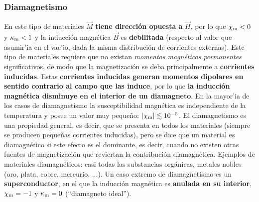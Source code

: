\subsubsection{Diamagnetismo}
En este tipo de materiales $\vec{M}$ \textbf{tiene dirección opuesta a}  $\vec{H}$, por lo que $\chi_{\rm m}<0$ y $\kappa_{\rm m}<1$ y la inducción magnética $\vec{B}$ es \textbf{debilitada} (respecto al valor que asumir'ia en el vac'io, dada la misma distribución de corrientes externas). Este tipo de materiales requiere que no existan \textit{momentos magnéticos permanentes} significativos, de modo que la magnetización se deba principalmente a \textbf{corrientes inducidas}. Estas \textbf{corrientes inducidas generan momentos dipolares en sentido contrario al campo que las induce}, por lo que \textbf{la inducción magnética disminuye en el interior de un diamagneto}. En la mayor'ia de los casos de diamagnetismo la susceptibilidad magnética es independiente de la
temperatura y posee un valor muy peque\~no: $|\chi_{\rm m}|\lesssim 10^{-5}$. El
diamagnetismo es una propiedad general, es decir, que se presenta en todos los
materiales (siempre se producen peque\~nas corrientes inducidas), pero se dice
que un material es diamagnético si este efecto es el dominante, es decir,
cuando no existen otras fuentes de magnetización que reviertan la contribución diamagnética.
Ejemplos de materiales diamagnéticos: casi todas las substancias orgánicas,
metales nobles (oro, plata, cobre, mercurio, ...). Un caso extremo de
diamagnetismo es un \textbf{superconductor}, en el que la inducción magnética
es \textbf{anulada en su interior}, $\chi_{\rm m}=-1$ y $\kappa_{\rm m}=0$ (``diamagneto ideal'').

